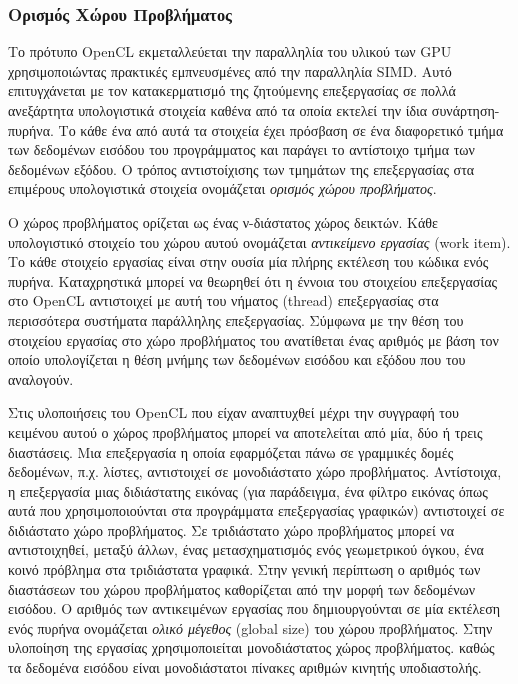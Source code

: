 \subsubsection*{Ορισμός Χώρου Προβλήματος}

\noindent Το πρότυπο OpenCL εκμεταλλεύεται την παραλληλία του υλικού των GPU χρησιμοποιώντας πρακτικές εμπνευσμένες από την παραλληλία SIMD. Αυτό επιτυγχάνεται με τον κατακερματισμό της ζητούμενης επεξεργασίας σε πολλά ανεξάρτητα υπολογιστικά στοιχεία καθένα από τα οποία εκτελεί την ίδια  συνάρτηση-πυρήνα. Το κάθε ένα από αυτά τα στοιχεία έχει πρόσβαση σε ένα διαφορετικό τμήμα των δεδομένων εισόδου του προγράμματος και παράγει το αντίστοιχο τμήμα των δεδομένων εξόδου. Ο τρόπος αντιστοίχισης των τμημάτων της επεξεργασίας στα επιμέρους υπολογιστικά στοιχεία ονομάζεται \textit{ορισμός χώρου προβλήματος}.

Ο χώρος προβλήματος ορίζεται ως ένας ν-διάστατος χώρος δεικτών. Κάθε υπολογιστικό στοιχείο του χώρου αυτού ονομάζεται \textit{αντικείμενο εργασίας} (work item). Το κάθε στοιχείο εργασίας είναι στην ουσία μία πλήρης εκτέλεση του κώδικα ενός πυρήνα. Καταχρηστικά μπορεί να θεωρηθεί ότι η έννοια του στοιχείου επεξεργασίας στο OpenCL αντιστοιχεί με αυτή του νήματος (thread) επεξεργασίας στα περισσότερα συστήματα παράλληλης επεξεργασίας. Σύμφωνα με την θέση του στοιχείου εργασίας στο χώρο προβλήματος του ανατίθεται ένας αριθμός με βάση τον οποίο υπολογίζεται η θέση μνήμης των δεδομένων εισόδου και εξόδου που του αναλογούν. 
 
Στις υλοποιήσεις του OpenCL που είχαν αναπτυχθεί μέχρι την συγγραφή του κειμένου αυτού ο χώρος προβλήματος μπορεί να αποτελείται από μία, δύο ή τρεις διαστάσεις. Μια επεξεργασία η οποία εφαρμόζεται πάνω σε γραμμικές δομές δεδομένων, π.χ. λίστες, αντιστοιχεί σε μονοδιάστατο χώρο προβλήματος. Αντίστοιχα, η επεξεργασία μιας διδιάστατης εικόνας (για παράδειγμα, ένα φίλτρο εικόνας όπως αυτά που χρησιμοποιούνται στα προγράμματα επεξεργασίας γραφικών) αντιστοιχεί σε διδιάστατο χώρο προβλήματος. Σε τριδιάστατο χώρο προβλήματος μπορεί να αντιστοιχηθεί, μεταξύ άλλων, ένας μετασχηματισμός ενός γεωμετρικού όγκου, ένα κοινό πρόβλημα στα τριδιάστατα γραφικά. Στην γενική περίπτωση ο αριθμός των διαστάσεων του χώρου προβλήματος καθορίζεται από την μορφή των δεδομένων εισόδου. Ο αριθμός των αντικειμένων εργασίας που δημιουργούνται σε μία εκτέλεση ενός πυρήνα ονομάζεται \textit{ολικό μέγεθος} (global size) του χώρου προβλήματος. Στην υλοποίηση της εργασίας χρησιμοποιείται μονοδιάστατος χώρος προβλήματος. καθώς τα δεδομένα 
εισόδου είναι μονοδιάστατοι πίνακες αριθμών κινητής υποδιαστολής.

